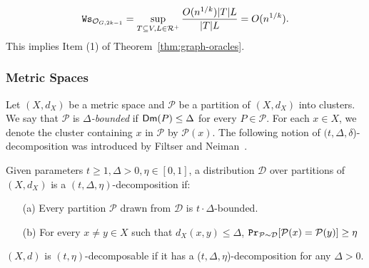 \begin{equation*}
	\mathtt{Ws}_{\mathcal{O}_{G,2k-1}} = \sup_{T\subseteq V, L \in \mathcal{R}^+} \frac{O(n^{1/k})|T|L}{|T|L} = O(n^{1/k}).
\end{equation*}
This implies Item (1) of Theorem~\ref{thm:graph-oracles}.

\subsubsection{Metric Spaces}\label{subsec:metric}

Let $(X,d_X)$ be a metric space and $\mathcal{P}$ be a partition  of $(X,d_X)$ into clusters. We say  that $\mathcal{P}$ is  \emph{$\Delta$-bounded} if $\mathsf{Dm}(P) \leq \Delta$ for every $P \in \mathcal{P}$.  For each $x \in X$, we denote the cluster containing $x$ in $\mathcal{P}$ by $\mathcal{P}(x)$. The following notion of $(t,\Delta,\delta$)-decomposition was introduced by Filtser and Neiman~\cite{FN18}.


\begin{definition} Given parameters $t \geq 1, \Delta > 0, \eta \in [0,1]$, a distribution $\mathcal{D}$ over partitions of $(X,d_X)$ is a $(t,\Delta,\eta)$-decomposition if:
	\begin{itemize}
		\item[(a)] Every partition $\mathcal{P}$ drawn from $\mathcal{D}$ is $t\cdot\Delta$-bounded.
		\item[(b)] For every $x\not= y \in X$ such that $d_X(x,y) \leq \Delta$, $\operatorname{\mathtt{Pr}}\limits_{\mathcal{P}\sim \mathcal{D}}[\mathcal{P}(x) = \mathcal{P}(y)] \geq \eta$
	\end{itemize}
\end{definition}

$(X,d)$ is $(t,\eta)$-decomposable if it has a ($t,\Delta,\eta$)-decomposition for any $\Delta > 0$.

